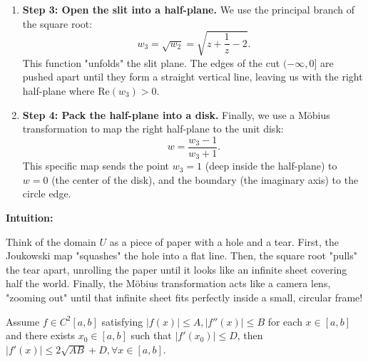 \begin{solution}
\begin{enumerate}
    \item \textbf{Step 3: Open the slit into a half-plane.}
        We use the principal branch of the square root:
        \[ w_3 = \sqrt{w_2} = \sqrt{z + \frac{1}{z} - 2}. \]
        This function "unfolds" the slit plane. The edges of the cut $(-\infty, 0]$ are pushed apart until they form a straight vertical line, leaving us with the right half-plane where $\text{Re}(w_3) > 0$.

    \item \textbf{Step 4: Pack the half-plane into a disk.}
        Finally, we use a Möbius transformation to map the right half-plane to the unit disk:
        \[ w = \frac{w_3 - 1}{w_3 + 1}. \]
        This specific map sends the point $w_3 = 1$ (deep inside the half-plane) to $w = 0$ (the center of the disk), and the boundary (the imaginary axis) to the circle edge.
\end{enumerate}


\textbf{Intuition:}

Think of the domain $U$ as a piece of paper with a hole and a tear. First, the Joukowski map "squashes" the hole into a flat line. Then, the square root "pulls" the tear apart, unrolling the paper until it looks like an infinite sheet covering half the world. Finally, the Möbius transformation acts like a camera lens, "zooming out" until that infinite sheet fits perfectly inside a small, circular frame!
\end{solution}

\begin{exercise}
\label{analysis:2011:4}
Assume $f \in C^2[a, b]$ satisfying $|f(x)| \leq A, |f''(x)| \leq B$ for each $x \in [a, b]$ and there exists $x_0 \in [a, b]$ such that $|f'(x_0)| \leq D$, then $|f'(x)| \leq 2\sqrt{AB} + D, \forall x \in [a, b]$.
\end{exercise}

